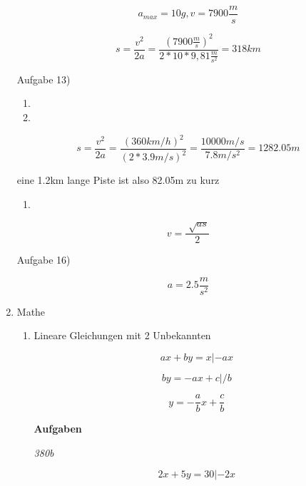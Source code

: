 \documentclass[11pt]{article}
\begin{document}
\begin{enumerate}
\begin{equation}
a_{max} = 10g, v = 7900 \frac{m}{s}
\end{equation}

\begin{equation}
s = \frac{v^2}{2a} = \frac{(7900\frac{m}{s})^2}{2 * 10 * 9,81\frac{m}{s^2}} = 318km
\end{equation}

Aufgabe 13)

\begin{enumerate}
\item 
\item 
\end{enumerate}
\begin{equation}
s = \frac{v^2}{2a} = \frac{(360km/h)^2}{(2*3.9m/s)^2} = \frac{10000m/s}{7.8m/s^2} = 1282.05m
\end{equation}

eine 1.2km lange Piste ist also 82.05m zu kurz

\begin{enumerate}
\item 
\end{enumerate}
\begin{equation}
v = \frac{\sqrt[]{as}}{2}
\end{equation}


Aufgabe 16)

\begin{equation}
a = 2.5\frac{m}{s^2}
\end{equation}




\item Mathe
\label{sec-1-2-6-2}
\begin{enumerate}
\item Lineare Gleichungen mit 2 Unbekannten
\label{sec-1-2-6-2-1}


\begin{equation}
ax + by = x | -ax
\end{equation}

\begin{equation}
by = -ax + c | / b
\end{equation}

\begin{equation}
y = - \frac{a}{b}x + \frac{c}{b}
\end{equation}

\textbf{Aufgaben}

\emph{380b}


\begin{equation}
2x + 5y = 30 | -2x
\end{equation}


\end{enumerate}
\end{enumerate}
\end{document}
